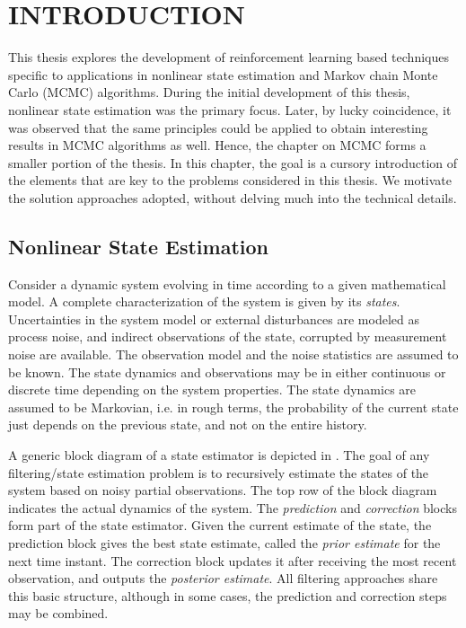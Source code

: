 \chapter{INTRODUCTION} 
\label{chap1_intro}

This thesis explores the development of reinforcement learning based techniques specific to applications in nonlinear state estimation and Markov chain Monte Carlo (MCMC) algorithms. During the initial development of this thesis, nonlinear state estimation was the primary focus. Later, by lucky coincidence, it was observed that the same principles could be applied to obtain interesting results in MCMC algorithms as well. Hence, the chapter on MCMC forms a smaller portion of the thesis. In this chapter, the goal is a cursory introduction of the elements that are key to the problems considered in this thesis. We motivate the solution approaches adopted, without delving much into the technical details. 

\section{Nonlinear State Estimation}
Consider a dynamic system evolving in time according to a given mathematical model. A complete characterization of the system is given by its \textit{states}. Uncertainties in the system model or external disturbances are modeled as process noise, and indirect observations of the state, corrupted by measurement noise are available. The observation model and the noise statistics are assumed to be known. The state dynamics and observations may be in either continuous or discrete time depending on the system properties. The state dynamics are assumed to be Markovian, i.e. in rough terms, the probability of the current state just depends on the previous state, and not on the entire history. 

A generic block diagram of a state estimator is depicted in . The goal of any filtering/state estimation problem is to recursively estimate the states of the system based on noisy partial observations. The top row of the block diagram indicates the actual dynamics of the system. The \textit{prediction} and \textit{correction} blocks form part of the state estimator. Given the current estimate of the state, the prediction block gives the best state estimate, called the \textit{prior estimate} for the next time instant. The correction block updates it after receiving the most recent observation, and outputs the \textit{posterior estimate}. All filtering approaches share this basic structure, although in some cases, the prediction and correction steps may be combined.  

